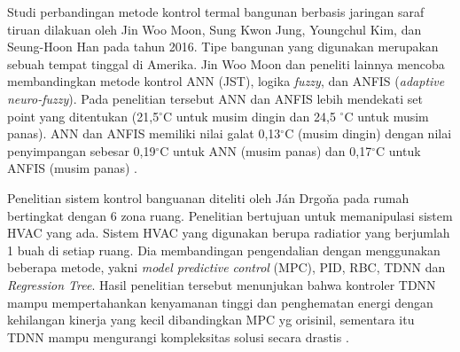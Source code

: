 Studi perbandingan metode kontrol termal bangunan berbasis jaringan saraf tiruan dilakuan oleh Jin Woo Moon, Sung Kwon Jung, Youngchul Kim, dan Seung-Hoon Han pada tahun 2016. Tipe bangunan yang digunakan merupakan sebuah tempat tinggal di Amerika. Jin Woo Moon dan peneliti lainnya mencoba membandingkan metode kontrol ANN (JST), logika \textit{fuzzy}, dan ANFIS (\textit{adaptive neuro-fuzzy}). Pada penelitian tersebut ANN dan ANFIS lebih mendekati set point yang ditentukan (21,5$^{\circ}$C untuk musim dingin dan 24,5 $^{\circ}$C untuk musim panas). ANN dan ANFIS memiliki nilai galat 0,13$^{\circ}$C (musim dingin) dengan nilai penyimpangan sebesar 0,19$^{\circ}$C untuk ANN (musim panas) dan 0,17$^{\circ}$C untuk ANFIS (musim panas) \cite{paper22SKJung}.


Penelitian sistem kontrol banguanan diteliti oleh Ján Drgoňa pada rumah bertingkat dengan 6 zona ruang. Penelitian bertujuan untuk memanipulasi sistem HVAC yang ada. Sistem HVAC yang digunakan berupa radiatior yang berjumlah 1 buah di setiap ruang. Dia membandingan pengendalian dengan menggunakan beberapa metode, yakni \textit{model predictive control} (MPC), PID, RBC, TDNN dan \textit{Regression Tree}. Hasil penelitian tersebut menunjukan bahwa kontroler TDNN mampu mempertahankan kenyamanan tinggi dan penghematan energi dengan kehilangan kinerja yang kecil dibandingkan MPC yg orisinil, sementara itu TDNN mampu mengurangi kompleksitas solusi secara drastis \cite{paper22JanDrgona}.


